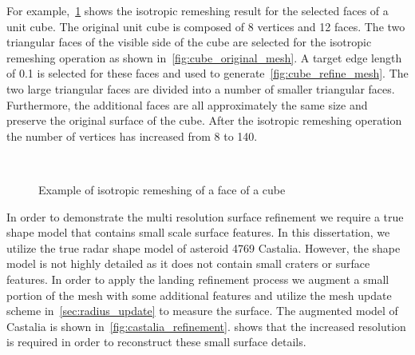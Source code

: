 \documentclass[letterpaper, paper,11pt]{AAS}		%
\begin{document}
For example,~\cref{fig:cube_remesh} shows the isotropic remeshing result for the selected faces of a unit cube.
The original unit cube is composed of \num{8} vertices and \num{12} faces.
The two triangular faces of the visible side of the cube are selected for the isotropic remeshing operation as shown in~\cref{fig:cube_original_mesh}.
A target edge length of \num{0.1} is selected for these faces and used to generate~\cref{fig:cube_refine_mesh}.
The two large triangular faces are divided into a number of smaller triangular faces.
Furthermore, the additional faces are all approximately the same size and preserve the original surface of the cube.
After the isotropic remeshing operation the number of vertices has increased from \num{8} to \num{140}.
\begin{figure}[htbp]
    \centering
    ~
    \caption{Example of isotropic remeshing of a face of a cube\label{fig:cube_remesh}}
\end{figure}

In order to demonstrate the multi resolution surface refinement we require a true shape model that contains small scale surface features.
In this dissertation, we utilize the true radar shape model of asteroid 4769 Castalia.
However, the shape model is not highly detailed as it does not contain small craters or surface features.
In order to apply the landing refinement process we augment a small portion of the mesh with some additional features and utilize the mesh update scheme in~\cref{sec:radius_update} to measure the surface.
The augmented model of Castalia is shown in~\cref{fig:castalia_refinement}.
 shows that the increased resolution is required in order to reconstruct these small surface details.
\end{document}
